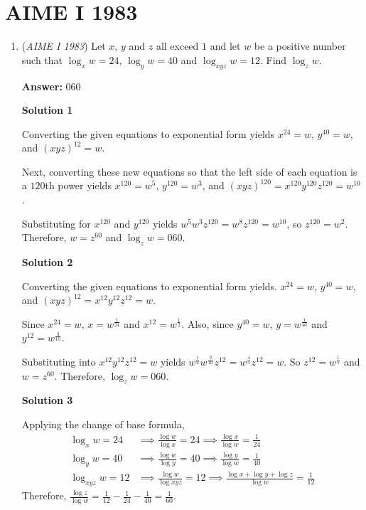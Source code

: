 \section{AIME I 1983}
        \begin{enumerate}
        	\item (\textit{AIME I 1983}) Let $x$, $y$ and $z$ all exceed $1$ and let $w$ be a positive number such that $\log_xw=24$, $\log_y w = 40$ and $\log_{xyz}w=12$. Find $\log_zw$.


 
 \textbf{Answer: }060



\textbf{Solution 1}

Converting the given equations to exponential form yields $x^{24}=w$, $y^{40}=w$, and $(xyz)^{12}=w$. 

 Next, converting these new equations so that the left side of each equation is a $120$th power yields $x^{120}=w^5$, $y^{120}=w^3$, and $(xyz)^{120}=x^{120}y^{120}z^{120} = w^{10}$.

 Substituting for $x^{120}$ and $y^{120}$ yields $w^5w^3z^{120}=w^8z^{120}=w^{10}$, so $z^{120}=w^2$.  Therefore, $w = z^{60}$ and $\log_z w=\boxed{060}$.

 



\textbf{Solution 2}

Converting the given equations to exponential form yields. $x^{24}=w$, $y^{40}=w$, and $(xyz)^{12}=x^{12}y^{12}z^{12} = w$. 

 Since $x^{24} = w$, $x = w^{\frac{1}{24}}$ and $x^{12} = w^{\frac{1}{2}}$.  Also, since $y^{40} = w$, $y = w^{\frac{1}{40}}$ and $y^{12} = w^{\frac{3}{10}}$.

 Substituting into $x^{12}y^{12}z^{12} = w$ yields $w^{\frac{1}{2}}w^{\frac{3}{10}}z^{12}=w^{\frac{4}{5}}z^{12}=w$. So $z^{12} = w^\frac{1}{5}$ and $w = z^{60}$. Therefore, $\log_{z} w =\boxed{060}$.

 



\textbf{Solution 3}

Applying the change of base formula,
 \begin{align*} \log_x w = 24 &\implies \frac{\log w}{\log x} = 24 \implies \frac{\log x}{\log w} = \frac 1 {24} \\ \log_y w = 40 &\implies \frac{\log w}{\log y} = 40 \implies \frac{\log y}{\log w} = \frac 1 {40} \\ \log_{xyz} w = 12 &\implies \frac{\log {w}}{\log {xyz}} = 12 \implies \frac{\log x +\log y + \log z}{\log w} = \frac 1 {12} \end{align*}
Therefore, $\frac {\log z}{\log w} = \frac 1 {12} - \frac 1 {24} - \frac 1{40} = \frac 1 {60}$. 


\end{enumerate}
